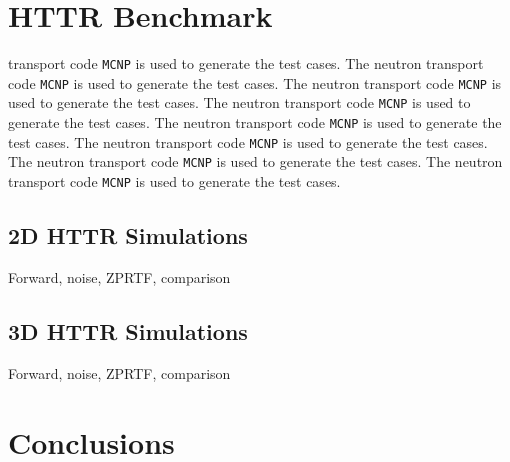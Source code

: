 \section{HTTR Benchmark}
\label{sec:httr_benchmark}
transport code \texttt{MCNP} is used to generate the test cases. The neutron transport code \texttt{MCNP} is used to generate the test cases. The neutron transport code \texttt{MCNP} is used to generate the test cases. The neutron transport code \texttt{MCNP} is used to generate the test cases. The neutron transport code \texttt{MCNP} is used to generate the test cases. The neutron transport code \texttt{MCNP} is used to generate the test cases. The neutron transport code \texttt{MCNP} is used to generate the test cases. The neutron transport code \texttt{MCNP} is used to generate the test cases.

\subsection{2D HTTR Simulations}
Forward, noise, ZPRTF, comparison

\subsection{3D HTTR Simulations}
Forward, noise, ZPRTF, comparison

\section{Conclusions}